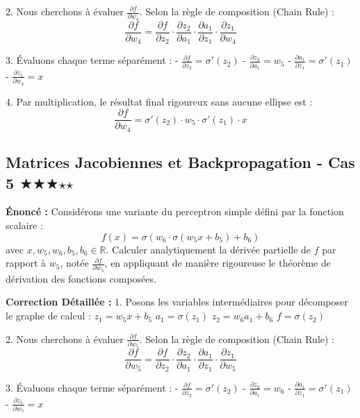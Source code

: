 \documentclass[11pt,a4paper]{article}
\begin{document}
2. Nous cherchons à évaluer $\frac{{\partial f}}{{\partial w_{4}}}$. Selon la règle de composition (Chain Rule) :
   $$ \frac{{\partial f}}{{\partial w_{4}}} = \frac{{\partial f}}{{\partial z_2}} \cdot \frac{{\partial z_2}}{{\partial a_1}} \cdot \frac{{\partial a_1}}{{\partial z_1}} \cdot \frac{{\partial z_1}}{{\partial w_{4}}} $$

3. Évaluons chaque terme séparément :
   - $\frac{{\partial f}}{{\partial z_2}} = \sigma'(z_2)$
   - $\frac{{\partial z_2}}{{\partial a_1}} = w_{5}$
   - $\frac{{\partial a_1}}{{\partial z_1}} = \sigma'(z_1)$
   - $\frac{{\partial z_1}}{{\partial w_{4}}} = x$

4. Par multiplication, le résultat final rigoureux sans aucune ellipse est :
   $$ \frac{{\partial f}}{{\partial w_{4}}} = \sigma'(z_2) \cdot w_{5} \cdot \sigma'(z_1) \cdot x $$

\vspace{1cm}

\subsection*{Matrices Jacobiennes et Backpropagation - Cas 5 $\bigstar$$\bigstar$$\bigstar$$\star$$\star$}

\textbf{Énoncé :}
Considérons une variante du perceptron simple défini par la fonction scalaire :
$$ f(x) = \sigma(w_{6} \cdot \sigma(w_{5} x + b_{5}) + b_{6}) $$
avec $x, w_{5}, w_{6}, b_{5}, b_{6} \in \mathbb{R}$.
Calculer analytiquement la dérivée partielle de $f$ par rapport à $w_{5}$, notée $\frac{{\partial f}}{{\partial w_{5}}}$, en appliquant de manière rigoureuse le théorème de dérivation des fonctions composées.

\textbf{Correction Détaillée :}
1. Posons les variables intermédiaires pour décomposer le graphe de calcul :
   $z_1 = w_{5} x + b_{5}$
   $a_1 = \sigma(z_1)$
   $z_2 = w_{6} a_1 + b_{6}$
   $f = \sigma(z_2)$

2. Nous cherchons à évaluer $\frac{{\partial f}}{{\partial w_{5}}}$. Selon la règle de composition (Chain Rule) :
   $$ \frac{{\partial f}}{{\partial w_{5}}} = \frac{{\partial f}}{{\partial z_2}} \cdot \frac{{\partial z_2}}{{\partial a_1}} \cdot \frac{{\partial a_1}}{{\partial z_1}} \cdot \frac{{\partial z_1}}{{\partial w_{5}}} $$

3. Évaluons chaque terme séparément :
   - $\frac{{\partial f}}{{\partial z_2}} = \sigma'(z_2)$
   - $\frac{{\partial z_2}}{{\partial a_1}} = w_{6}$
   - $\frac{{\partial a_1}}{{\partial z_1}} = \sigma'(z_1)$
   - $\frac{{\partial z_1}}{{\partial w_{5}}} = x$
\end{document}
